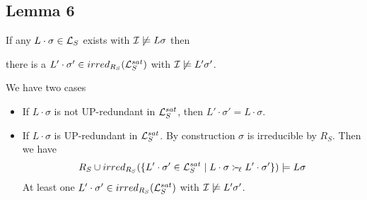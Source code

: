 \documentclass[%
handout,
]{beamer}
\begin{document}
\subsection{Lemma 6}
\begin{frame}
    \begin{lemma}\label{existence}

    If any $L\cdot\sigma\in\mathcal{L}_S$ exists with $\mathcal{I}\not\models L\sigma$ then

    there is a $L'\cdot\sigma'\in irred_{R_S}(\mathcal{L}_S^{sat})$ with $\mathcal{I}\not\models L'\sigma'$.
    \end{lemma}

    \begin{Proof}
        We have two cases

    \begin{itemize}
        \item If $L\cdot\sigma$ is not UP-redundant in $\mathcal{L}_S^{sat}$,
        then $L'\cdot\sigma'=L\cdot\sigma$.
        \hfill\checkmark

        \item If $L\cdot\sigma$ is UP-redundant in $\mathcal{L}_S^{sat}$.
    By construction $\sigma$ is irreducible by $R_S$. Then we have
    \begin{align*}
        R_S \cup irred_{R_S}(
            \{
            L'\cdot\sigma'\in\mathcal{L}_S^{sat}
            \mid
            L\cdot\sigma \mathrel\succ_{\!\ell} L'\cdot\sigma'
            \}
        )
        \models
        L\sigma
    \end{align*}
    At least one $L'\cdot\sigma'\in irred_{R_S}(\mathcal{L}_S^{sat})$
    with $\mathcal{I}\not\models L'\sigma'$.
    \hfill\checkmark
    \end{itemize}
\end{Proof}
\end{frame}
\end{document}
